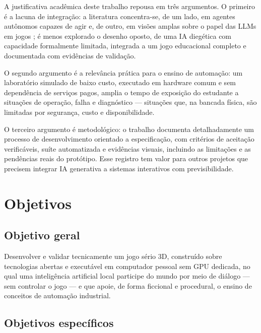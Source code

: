 A justificativa acadêmica deste trabalho repousa em três argumentos. O
primeiro é a lacuna de integração: a literatura concentra-se, de um lado, em
agentes autônomos capazes de agir \cite{park2023generative,wang2023voyager} e,
de outro, em visões amplas sobre o papel das LLMs em jogos
\cite{gallotta2024largelanguage}; é menos explorado o desenho oposto, de uma
IA diegética com capacidade formalmente limitada, integrada a um jogo
educacional completo e documentada com evidências de validação.

O segundo argumento é a relevância prática para o ensino de automação: um
laboratório simulado de baixo custo, executado em hardware comum e sem
dependência de serviços pagos, amplia o tempo de exposição do estudante a
situações de operação, falha e diagnóstico --- situações que, na bancada
física, são limitadas por segurança, custo e disponibilidade.

O terceiro argumento é metodológico: o trabalho documenta detalhadamente um
processo de desenvolvimento orientado a especificação, com critérios de
aceitação verificáveis, suíte automatizada e evidências visuais, incluindo as
limitações e as pendências reais do protótipo. Esse registro tem valor para
outros projetos que precisem integrar IA generativa a sistemas interativos com
previsibilidade.

\section{Objetivos}
\label{sec:objetivos}

\subsection{Objetivo geral}

Desenvolver e validar tecnicamente um jogo sério 3D, construído sobre
tecnologias abertas e executável em computador pessoal sem GPU dedicada, no
qual uma inteligência artificial local participe do mundo por meio de diálogo
--- sem controlar o jogo --- e que apoie, de forma ficcional e procedural, o
ensino de conceitos de automação industrial.

\subsection{Objetivos específicos}


